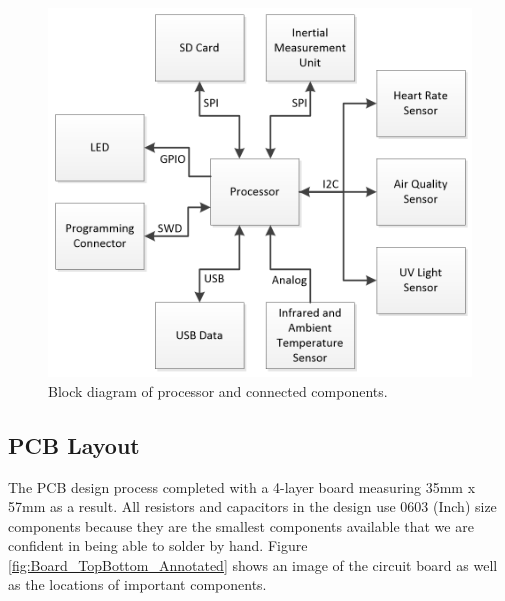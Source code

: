 \begin{figure}[!htb]
\centering
\includegraphics[width=\textwidth]{images/BlockDiagram_Processor.png}
\caption{Block diagram of processor and connected components.}
\label{fig:BlockDiagram_Processor}
\end{figure}

\subsection{PCB Layout}

The PCB design process completed with a 4-layer board measuring 35mm x 57mm as 
a result. All resistors and capacitors in the design use 0603 (Inch) size 
components because they are the smallest components available that we are
confident in being able to solder by hand. Figure \ref{fig:Board_TopBottom_Annotated}
shows an image of the circuit board as well as the locations of important 
components.

